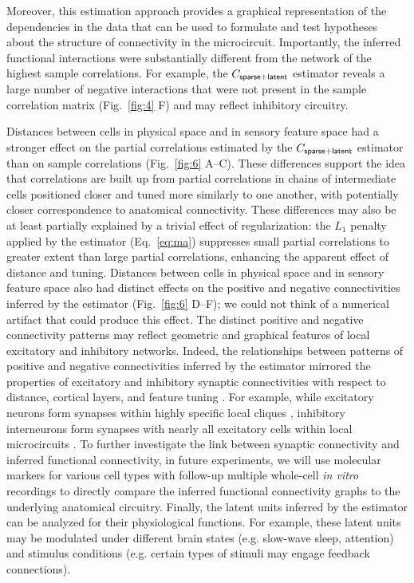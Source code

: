 Moreover, this estimation approach provides a graphical representation of the dependencies in the data that can be used to formulate and test hypotheses about the structure of connectivity in the microcircuit. Importantly, the inferred functional interactions were substantially different from the network of the highest sample correlations.  For example, the $C_{\sf sparse+latent}$ estimator reveals a large number of negative interactions that were not present in the sample correlation matrix (Fig.~\ref{fig:4} F) and may reflect inhibitory circuitry.

Distances between cells in physical space and in sensory feature space had a stronger effect on the partial correlations estimated by the $C_{\sf sparse+latent}$ estimator than on sample correlations (Fig.~\ref{fig:6} A--C).
These differences support the idea that correlations are built up from partial correlations in chains of intermediate cells positioned closer and tuned more similarly to one another, with potentially closer correspondence to anatomical connectivity.  These differences may also be at least partially explained by a trivial effect of regularization: the $L_1$ penalty applied by the estimator (Eq.~\ref{eq:ma}) suppresses small partial correlations to greater extent than large partial correlations, enhancing the apparent effect of distance and tuning.  Distances between cells in physical space and in sensory feature space also had distinct effects on the positive and negative connectivities inferred by the estimator (Fig.~\ref{fig:6} D--F); we could not think of a numerical artifact that could produce this effect. The distinct positive and negative connectivity patterns  may reflect geometric and graphical features of local excitatory and inhibitory networks. Indeed, the relationships between patterns of positive and negative connectivities inferred by the estimator mirrored the properties of excitatory and inhibitory synaptic connectivities with respect to distance, cortical layers, and feature tuning \citep{Song:2005, Oswald:2008, Adesnik:2010, Perin:2011, Fino:2011, Hofer:2011, Isaacson:2011, Levy:2012}. For example, while excitatory neurons form synapses within highly specific local cliques \citep{Perin:2011}, inhibitory interneurons form synapses with nearly all excitatory cells within local microcircuits \citep{Fino:2011, Hofer:2011, Packer:2011}.  To further investigate the link between synaptic connectivity and inferred functional connectivity, in future experiments, we will use molecular markers for various cell types with follow-up multiple whole-cell \emph{in vitro} recordings \citep{Hofer:2011, Ko:2013} to directly compare the inferred functional connectivity graphs to the underlying anatomical circuitry. Finally, the latent units inferred by the estimator can be analyzed for their physiological functions. For example, these latent units may be modulated under different brain states (e.g. slow-wave sleep, attention) and stimulus conditions (e.g. certain types of stimuli may engage feedback connections).
